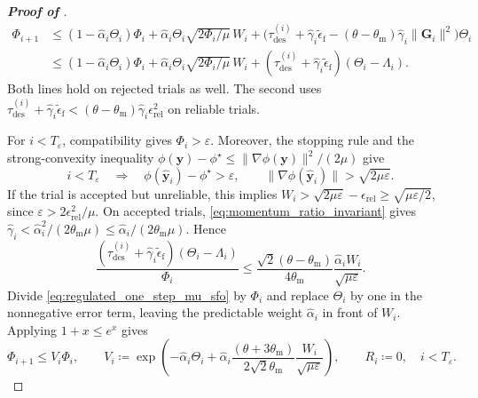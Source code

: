 \documentclass{article}
\begin{document}
\begin{proof}[\textbf{Proof of }]
\begin{equation}
\begin{aligned}
\Phi_{i+1}
&\le(1-\hat\alpha_i\Theta_i)\Phi_i
+\hat\alpha_i\Theta_i\sqrt{2\Phi_i/\mu}\,W_i+\bigl(
\tau_{\mathrm{des}}^{(i)}+\hat\gamma_i\widetilde\epsilon_{\mathrm{f}}
-(\theta-\theta_{\mathrm{m}})\hat\gamma_i\|\mathbf{G}_i\|^2\bigr)\Theta_i\\
&\le(1-\hat\alpha_i\Theta_i)\Phi_i
+\hat\alpha_i\Theta_i\sqrt{2\Phi_i/\mu}\,W_i
+(\tau_{\mathrm{des}}^{(i)}+\hat\gamma_i\widetilde\epsilon_{\mathrm{f}})
(\Theta_i-\Lambda_i).
\end{aligned}
\end{equation}
Both lines hold on rejected trials as well. The second uses
\(\tau_{\mathrm{des}}^{(i)}+\hat\gamma_i\widetilde\epsilon_{\mathrm{f}}
<(\theta-\theta_{\mathrm{m}})\hat\gamma_i\epsilon_{\mathrm{rel}}^2\)
on reliable trials.

For \(i<T_\varepsilon\), compatibility gives \(\Phi_i>\varepsilon\).
Moreover, the stopping rule and the strong-convexity inequality
\(\phi(\bm{y})-\phi^\star\le\|\nabla\phi(\bm{y})\|^2/(2\mu)\) give
\begin{equation}\label{eq:sc_pre_stop_gradient}
i<T_\varepsilon\quad\Longrightarrow\quad
\phi(\hat {\bm{y}}_i)-\phi^\star>\varepsilon,
\qquad\|\nabla\phi(\hat {\bm{y}}_i)\|>\sqrt{2\mu\varepsilon}.
\end{equation}
If the trial is accepted but unreliable, this implies
\(W_i>\sqrt{2\mu\varepsilon}-\epsilon_{\mathrm{rel}}
\ge\sqrt{\mu\varepsilon/2}\), since
\(\varepsilon>2\epsilon_{\mathrm{rel}}^2/\mu\).
On accepted trials, \eqref{eq:momentum_ratio_invariant} gives
\(\hat\gamma_i<\hat\alpha_i^2/(2\theta_{\mathrm{m}}\mu)
\le\hat\alpha_i/(2\theta_{\mathrm{m}}\mu)\). Hence
\[
\frac{(\tau_{\mathrm{des}}^{(i)}+\hat\gamma_i\widetilde\epsilon_{\mathrm{f}})
(\Theta_i-\Lambda_i)}{\Phi_i}
\le\frac{\sqrt2(\theta-\theta_{\mathrm{m}})}{4\theta_{\mathrm{m}}}
\frac{\hat\alpha_iW_i}{\sqrt{\mu\varepsilon}}.
\]
Divide \eqref{eq:regulated_one_step_mu_sfo} by $\Phi_i$ and replace $\Theta_i$ by one in the nonnegative error term, leaving the predictable weight $\hat\alpha_i$ in front of $W_i$. Applying $1+x\le e^x$ gives
\begin{equation}\label{eq:affine_module_mu_sfo}
\Phi_{i+1}\le V_i\Phi_i,\qquad
V_i\coloneqq \exp\!\left(-\hat\alpha_i\Theta_i+\hat\alpha_i
\frac{(\theta+3\theta_{\mathrm{m}})}
{2\sqrt2\theta_{\mathrm{m}}}\frac{W_i}{\sqrt{\mu\varepsilon}}\right),\qquad R_i\coloneqq 0,
\quad i<T_\varepsilon.
\end{equation}


\end{proof}
\end{document}
